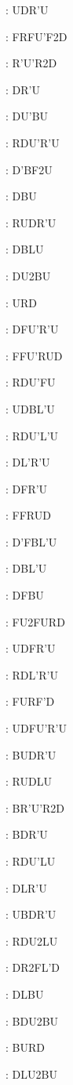 \documentclass[9pt]{article}
\begin{document}
{\begin{multicols}{6}
: UDR'U

: FRFU'F2D

: R'U'R2D

: DR'U

: DU'BU

: RDU'R'U

: D'BF2U

: DBU

: RUDR'U

: DBLU

: DU2BU

: URD

: DFU'R'U

: FFU'RUD

: RDU'FU

: UDBL'U

: RDU'L'U

: DL'R'U

: DFR'U

: FFRUD

: D'FBL'U

: DBL'U

: DFBU

: FU2FURD

: UDFR'U

: RDL'R'U

: FURF'D

: UDFU'R'U

: BUDR'U

: RUDLU

: BR'U'R2D

: BDR'U

: RDU'LU

: DLR'U

: UBDR'U

: RDU2LU

: DR2FL'D

: DLBU

: BDU2BU

: BURD

: DLU2BU


\end{multicols}}
\end{document}
